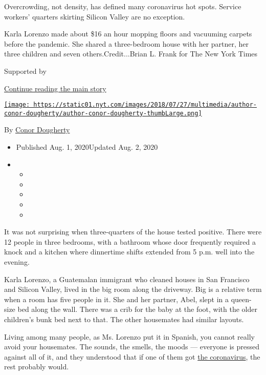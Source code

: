 Overcrowding, not density, has defined many coronavirus hot spots.
Service workers' quarters skirting Silicon Valley are no exception.

Karla Lorenzo made about \$16 an hour mopping floors and vacuuming
carpets before the pandemic. She shared a three-bedroom house with her
partner, her three children and seven others.Credit...Brian L. Frank for
The New York Times

Supported by

\protect\hyperlink{after-sponsor}{Continue reading the main story}

\href{https://www.nytimes.com/by/conor-dougherty}{\texttt{[image: https://static01.nyt.com/images/2018/07/27/multimedia/author-conor-dougherty/author-conor-dougherty-thumbLarge.png]}}

By \href{https://www.nytimes.com/by/conor-dougherty}{Conor Dougherty}

\begin{itemize}
\item
  Published Aug. 1, 2020Updated Aug. 2, 2020
\item
  \begin{itemize}
  \item
  \item
  \item
  \item
  \item
  \end{itemize}
\end{itemize}

It was not surprising when three-quarters of the house tested positive.
There were 12 people in three bedrooms, with a bathroom whose door
frequently required a knock and a kitchen where dinnertime shifts
extended from 5 p.m. well into the evening.

Karla Lorenzo, a Guatemalan immigrant who cleaned houses in San
Francisco and Silicon Valley, lived in the big room along the driveway.
Big is a relative term when a room has five people in it. She and her
partner, Abel, slept in a queen-size bed along the wall. There was a
crib for the baby at the foot, with the older children's bunk bed next
to that. The other housemates had similar layouts.

Living among many people, as Ms. Lorenzo put it in Spanish, you cannot
really avoid your housemates. The sounds, the smells, the moods ---
everyone is pressed against all of it, and they understood that if one
of them got \href{https://www.nytimes.com/news-event/coronavirus}{the
coronavirus}, the rest probably would.

